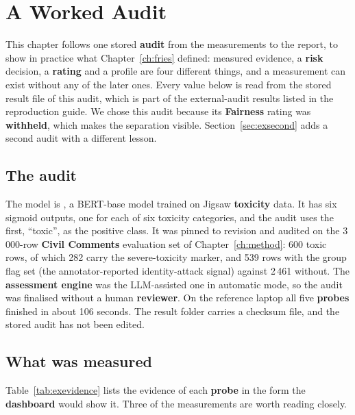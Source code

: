 \chapter{A Worked Audit}\label{ch:example}

This chapter follows one stored \textbf{audit} from the measurements to the report, to show in practice what Chapter~\ref{ch:fries} defined: measured evidence, a \textbf{risk} decision, a \textbf{rating} and a profile are four different things, and a measurement can exist without any of the later ones. Every value below is read from the stored result file of this audit, which is part of the external-audit results listed in the reproduction guide. We chose this audit because its \textbf{Fairness} rating was \textbf{withheld}, which makes the separation visible. Section~\ref{sec:exsecond} adds a second audit with a different lesson.

\section{The audit}
The model is , a BERT-base model trained on Jigsaw \textbf{toxicity} data. It has six sigmoid outputs, one for each of six toxicity categories, and the audit uses the first, ``toxic'', as the positive class. It was pinned to revision  and audited on the 3\,000-row \textbf{Civil Comments} evaluation set of Chapter~\ref{ch:method}: 600 toxic rows, of which 282 carry the severe-toxicity marker, and 539 rows with the group flag set (the annotator-reported identity-attack signal) against 2\,461 without. The \textbf{assessment engine} was the LLM-assisted one in automatic mode, so the audit was finalised without a human \textbf{reviewer}. On the reference laptop all five \textbf{probes} finished in about 106 seconds. The result folder carries a checksum file, and the stored audit has not been edited.

\section{What was measured}
Table~\ref{tab:exevidence} lists the evidence of each \textbf{probe} in the form the \textbf{dashboard} would show it. Three of the measurements are worth reading closely.

